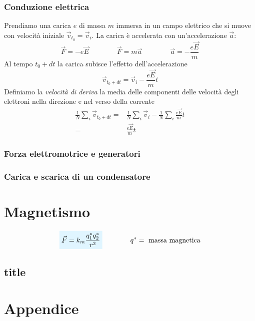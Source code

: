 \documentclass[x11names]{report}
\newcommand{\viola}[1]{%
	\colorbox{myblue}{$\displaystyle #1$}
}
\begin{document}
\subsection{Conduzione elettrica}
Prendiamo una carica \(e\) di massa \(m\) immersa in un campo elettrico che si muove con velocità iniziale \(\vec{v}_{t_0} = \vec{v}_i\). La carica è accelerata con un'accelerazione \(\vec{a}\):
\[
\vec{F} = -e\vec{E} \qquad \qquad \vec{F} = m \vec{a} \qquad \qquad \vec{a} = -\frac{e\vec{E}}{m}
\]
Al tempo \(t_0 + dt\) la carica subisce l'effetto dell'accelerazione
\[
\vec{v}_{t_0+dt} = \vec{v}_i -\frac{e\vec{E}}{m}t
\]
Definiamo la \textit{velocità di deriva} la media delle componenti delle velocità degli elettroni nella direzione e nel verso della corrente
\begin{align*}
	\frac{1}{N}\sum_i \vec{v}_{t_0 + dt} =& \frac{1}{N}\sum_i \vec{v}_i - \frac{1}{N}\sum_i\frac{e\vec{E}}{m}t \\
	=& \frac{e\vec{E}}{m}t
\end{align*}
\begin{center}
	\textcolor{red}{}
\end{center}


\subsection{Forza elettromotrice e generatori}
\subsection{Carica e scarica di un condensatore}


\chapter{Magnetismo}
\begin{equation}
	\viola{\vec{F} = k_m\frac{q_{1}^{*}q_{2}^{*}}{r^2}} \qquad \qquad q^{*} = \text{ massa magnetica}
\end{equation}

\section{title}


\chapter{Appendice}
\end{document}
